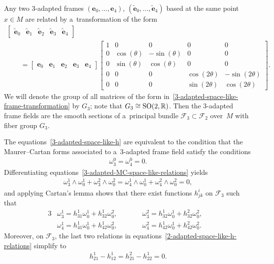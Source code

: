 \documentclass[pdftex]{sigma}
\numberwithin{equation}{section}
\theoremstyle{definition}
\begin{document}
Any two 3-adapted frames $(\mathbf{e}_0, \ldots, \mathbf{e}_4)$, $(\tilde{\mathbf{e}}_0, \ldots, \tilde{\mathbf{e}}_4)$
based at the same point $x \in M$ are related by a~transformation of the form
\begin{gather}
\begin{bmatrix}
\tilde{\mathbf{e}}_0 & \tilde{\mathbf{e}}_1 & \tilde{\mathbf{e}}_2 & \tilde{\mathbf{e}}_3 & \tilde{\mathbf{e}}_4
\end{bmatrix}
\nonumber
\\
\qquad{}
=
\begin{bmatrix}
\mathbf{e}_0 & \mathbf{e}_1 & \mathbf{e}_2 & \mathbf{e}_3 & \mathbf{e}_4
\end{bmatrix}
\begin{bmatrix}
1 & 0 & 0 & 0 & 0
\\
0 & \cos(\theta) & -\sin(\theta) & 0 & 0
\\
0 & \sin(\theta) & \cos(\theta) & 0 & 0
\\
0 & 0 & 0 & \cos(2\theta) & -\sin(2\theta)
\\
0 & 0 & 0 & \sin(2\theta) & \cos(2\theta)
\end{bmatrix}.
\label{3-adapted-space-like-frame-transformation}
\end{gather}
We will denote the group of all matrices of the form in~\eqref{3-adapted-space-like-frame-transformation} by $G_3$; note
that $G_3 \cong {\rm SO}(2,\mathbb{R})$.
Then the 3-adapted frame f\/ields are the smooth sections of a~principal bundle $\mathcal{F}_3 \subset \mathcal{F}_2$
over~$M$ with f\/iber group $G_3$.

The equations~\eqref{3-adapted-space-like-h} are equivalent to the condition that the Maurer--Cartan forms associated to
a~3-adapted frame f\/ield satisfy the conditions
\begin{gather}
\omega^0_3 = \omega^0_4 = 0.
\label{3-adapted-MC-space-like-relations}
\end{gather}
Dif\/ferentiating equations~\eqref{3-adapted-MC-space-like-relations} yields
\begin{gather*}
\omega^1_3 \wedge \omega^1_0 + \omega^2_3 \wedge \omega^2_0 = \omega^1_4 \wedge \omega^1_0 + \omega^2_4 \wedge
\omega^2_0 = 0,
\end{gather*}
and applying Cartan's lemma shows that there exist functions $h^i_{jk}$ on $\mathcal{F}_3$ such that
\begin{alignat*}{3}
& \omega^1_3=h^1_{31}\omega^1_0 + h^1_{32}\omega^2_0,
\qquad&&
\omega^2_3=h^1_{32}\omega^1_0 + h^2_{32}\omega^2_0,&
\\
&\omega^1_4=h^1_{41}\omega^1_0 + h^1_{42}\omega^2_0,
\qquad&&
\omega^2_4=h^1_{42}\omega^1_0 + h^2_{42}\omega^2_0.&
\end{alignat*}
Moreover, on $\mathcal{F}_3$, the last two relations in equations~\eqref{2-adapted-space-like-h-relations} simplify to
\begin{gather*}
h^1_{21} - h^1_{12} = h^2_{21} - h^1_{22} = 0.
\end{gather*}
\end{document}

